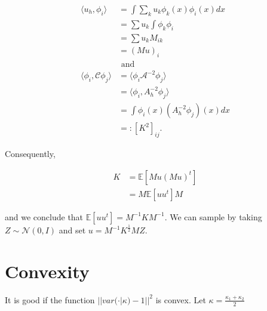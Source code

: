 \documentclass[paper=a4, fontsize=11pt]{scrartcl} %
\numberwithin{equation}{section} %
\numberwithin{figure}{section} %
\numberwithin{table}{section} %
\newcommand{\var}{\text{Var}}
\begin{document}
\begin{align*}
  \langle u_h , \phi_i \rangle &= \int \sum_{k} u_k \phi_k(x) \phi_i(x)dx\\
  &= \sum u_k \int \phi_k\phi_i \\
  &= \sum u_k M_{ik} \\
  &=(Mu)_i \\
  &\text{ and }\\ 
  \langle \phi_i, \mathcal{C} \phi_j \rangle  &= \langle \phi_{i} \mathcal{A}^{-2} \phi_{j} \rangle \\
  &= \langle \phi_{i}, A^{-2}_{h} \phi_{j} \rangle \\ 
  &=\int \phi_{i}(x) (A^{-2}_{h} \phi_j)(x) dx \\
  &=:[K^2]_{ij}.
\end{align*}

Consequently,

\begin{align*}
  K &= \mathbb{E}[ Mu (Mu)^t ]\\
  &= M \mathbb{E}[uu^t]M 
\end{align*}

and we conclude that $\mathbb{E}[uu^t] = M^{-1}KM^{-1}$. We can sample by taking $Z \sim \mathcal{N}(0,I)$
and set $u = M^{-1}K^{\frac{1}{2}}MZ$.











\section{Convexity}
It is good if the function $||var( \cdot | \kappa ) - 1 ||^2$ is convex. Let $\kappa = \frac{\kappa_1 + \kappa_2}{2}$




\end{document}
